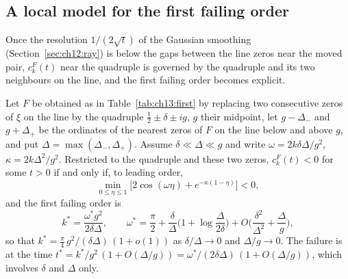 \subsection{A local model for the first failing order}\label{sec:xg:local}

Once the resolution $1/(2\sqrt t)$ of the Gaussian smoothing (Section~\ref{sec:ch12:ray}) is below the gaps between the line zeros near the moved pair, $c_k^F(t)$ near the quadruple is governed by the quadruple and its two neighbours on the line, and the first failing order becomes explicit.

\begin{proposition}\label{xg:prop:local}
Let $F$ be obtained as in Table~\ref{tab:ch13:first} by replacing two consecutive zeros of $\xi$ on the line by the quadruple $\frac12\pm\delta\pm ig$, $g$ their midpoint, let $g-\Delta_-$ and $g+\Delta_+$ be the ordinates of the nearest zeros of $F$ on the line below and above $g$, and put $\Delta=\max(\Delta_-,\Delta_+)$. Assume $\delta\ll\Delta\ll g$ and write $\omega=2k\delta\Delta/g^2$, $\kappa=2k\Delta^2/g^2$. Restricted to the quadruple and these two zeros, $c_k^F(t)<0$ for some $t>0$ if and only if, to leading order,
\[
\min_{0\le\eta\le1}\Big[2\cos(\omega\eta)+e^{-\kappa(1-\eta)}\Big]<0 ,
\]
and the first failing order is
\[
k^*=\frac{\omega^*g^2}{2\delta\Delta},\qquad \omega^*=\frac\pi2+\frac\delta\Delta\Big(1+\log\frac\Delta{2\delta}\Big)+O\Big(\frac{\delta^2}{\Delta^2}+\frac\Delta g\Big),
\]
so that $k^*=\frac\pi4\,g^2/(\delta\Delta)\,(1+o(1))$ as $\delta/\Delta\to0$ and $\Delta/g\to0$. The failure is at the time $t^*=k^*/g^2\,(1+O(\Delta/g))=\omega^*/(2\delta\Delta)\,(1+O(\Delta/g))$, which involves $\delta$ and $\Delta$ only.
\end{proposition}

